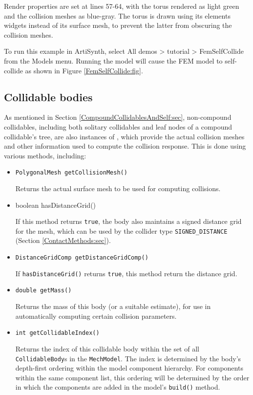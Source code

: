 Render properties are set at lines 57-64, with the torus rendered as
light green and the collision meshes as blue-gray. The torus is drawn
using its elements widgets instead of its surface mesh, to prevent
the latter from obscuring the collision meshes.

To run this example in ArtiSynth, select {\sf All demos > tutorial >
FemSelfCollide} from the {\sf Models} menu. Running the model will
cause the FEM model to self-collide as shown in
Figure \ref{FemSelfCollide:fig}.

\subsection{Collidable bodies}
\label{CollidableBodies:sec}

As mentioned in Section \ref{CompoundCollidablesAndSelf:sec},
non-compound collidables, including both solitary collidables and leaf
nodes of a compound collidable's tree, 
are also instances of 
, which
provide the actual collision meshes and other information used to
compute the collision response. This is done using various
methods, including:

\begin{itemize}

\item {\tt PolygonalMesh getCollisionMesh()}

Returns the actual surface mesh to be used for computing collisions.

\item {boolean hasDistanceGrid()}

If this method returns {\tt true}, the body also maintains a signed
distance grid for the mesh, which can be used by the collider type
{\tt SIGNED\_DISTANCE} (Section
\ref{ContactMethods:sec}).

\item {\tt DistanceGridComp getDistanceGridComp()}

If {\tt hasDistanceGrid()} returns {\tt true}, this method return the
distance grid.

\item {\tt double getMass()}

Returns the mass of this body (or a suitable estimate), for use
in automatically computing certain collision parameters.

\item {\tt int getCollidableIndex()}

Returns the index of this collidable body within the set of all {\tt
CollidableBody}s in the {\tt MechModel}. The index is determined by
the body's depth-first ordering within the model component
hierarchy. For components within the same component list, this ordering
will be determined by the order in which the components are added in
the model's {\tt build()} method.

\end{itemize}
%


